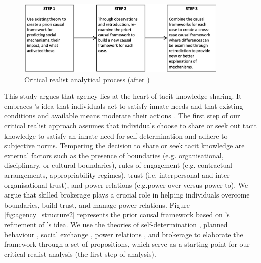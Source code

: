 \begin{figure}[hbt!]
\centering
\includegraphics[width = 0.9\textwidth,
height = 0.7\textheight, keepaspectratio]{Images/cr_steps.png}
\caption[Critical realist analytical process]{Critical realist analytical process (after \cite{mcavoy2018critical})}
\label{fig:cr_steps}
\end{figure}

This study argues that agency lies at the heart of tacit knowledge sharing. It embraces \citeauthor{parsons1937structure}'s \citeyearpar{parsons1937structure} idea that individuals act to satisfy innate needs and that existing conditions and available means moderate their actions \citep{loyal2001agency}. The first step of our critical realist approach assumes that individuals choose to share or seek out tacit knowledge to satisfy an innate need for self-determination and adhere to subjective norms. Tempering the decision to share or seek tacit knowledge are external factors such as the presence of boundaries (e.g. organisational, disciplinary, or cultural boundaries), rules of engagement (e.g. contractual arrangements, appropriability regimes), trust (i.e. interpersonal and inter-organisational trust), and power relations (e.g.power-over versus power-to). We argue that skilled brokerage plays a crucial role in helping individuals overcome boundaries, build trust, and manage power relations. Figure \ref{fig:agency_structure2} represents the prior causal framework based on \citeauthor{loyal2001agency}'s \citeyearpar{loyal2001agency} refinement of \citeauthor{parsons1937structure}'s \citeyearpar{parsons1937structure} idea. We use the theories of self-determination \citep{ryan2000self}, planned behaviour \citep{ajzen1985intentions}, social exchange \citep{blau1964exchange}, power relations \citep{emerson1962power}, and brokerage \citep{marsden1982brokerage,burt2005brokerage,obstfeld2014brokerage} to elaborate the framework through a set of propositions, which serve as a starting point for our critical realist analysis (the first step of analysis). \medskip

